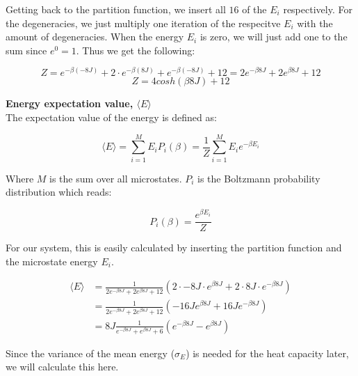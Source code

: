 \documentclass[../main.tex]{subfiles}
\begin{document}
    Getting back to the partition function, we insert all $16$ of the $E_i$ respectively. For the degeneracies, we just multiply one iteration of the respecitve $E_i$ with the amount of degeneracies. When the energy $E_i$ is zero, we will just add one to the sum since $e^0 = 1$. Thus we get the following:

    \[Z = e^{-\beta (-8J)} + 2 \cdot e^{-\beta (8J)} + e^{-\beta (-8J)} + 12 = 2e^{-\beta 8J} + 2e^{\beta 8J} + 12\]
    \[Z = 4cosh(\beta 8J) + 12\]

    \textbf{Energy expectation value, $\langle E \rangle$}\\
    The expectation value of the energy is defined as:

    \[\langle E \rangle = \sum_{i=1}^M E_i P_i(\beta) = \frac{1}{Z}\sum_{i=1}^M E_i e^{-\beta E_i}\]

    Where $M$ is the sum over all microstates. $P_i$ is the Boltzmann probability distribution which reads:

    \[P_i(\beta) = \frac{e^{\beta E_i}}{Z}\]

    For our system, this is easily calculated by inserting the partition function and the microstate energy $E_i$.

    \begin{align*}
      \langle E \rangle &= \frac{1}{2e^{-\beta 8J} + 2e^{\beta 8J} + 12} \left(2 \cdot -8J \cdot e^{\beta 8J} + 2\cdot 8J \cdot e^{-\beta8J}\right)\\
        &= \frac{1}{2e^{-\beta 8J} + 2e^{\beta 8J} + 12} \left(-16J e^{\beta8J} + 16Je^{-\beta 8J}\right)\\
        &= 8J \frac{1}{e^{-\beta 8J} + e^{\beta 8J} + 6}  \left(e^{-\beta8J} - e^{\beta 8J}\right)
    \end{align*}

    Since the variance of the mean energy ($\sigma_E$) is needed for the heat capacity later, we will calculate this here.
\end{document}
